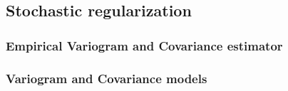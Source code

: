 \subsection{Stochastic regularization}\label{sub:crtomo_reg_sto}
\subsubsection{Empirical Variogram and Covariance estimator}\label{ssub:crtomo_reg_sto_empvar}
\subsubsection{Variogram and Covariance models}\label{ssub:crtomo_reg_sto_var}
